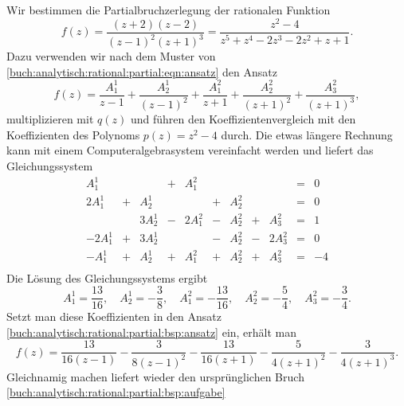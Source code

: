 \begin{beispiel}
Wir bestimmen die Partialbruchzerlegung der rationalen Funktion
\begin{equation}
f(z)
=
\frac{(z+2)(z-2)}{(z-1)^2(z+1)^3}
=
\frac{z^2-4}{z^5+z^4-2z^3-2z^2+z+1}.
\label{buch:analytisch:rational:partial:bsp:aufgabe}
\end{equation}
Dazu verwenden wir nach dem Muster von
\eqref{buch:analytisch:rational:partial:eqn:ansatz}
den Ansatz
\begin{equation}
f(z)
=
\frac{A^1_1}{z-1}
+
\frac{A^1_2}{(z-1)^2}
+
\frac{A^2_1}{z+1}
+
\frac{A^2_2}{(z+1)^2}
+
\frac{A^2_3}{(z+1)^3},
\label{buch:analytisch:rational:partial:bsp:ansatz}
\end{equation}
multiplizieren mit $q(z)$ und führen den Koeffizientenvergleich
mit den Koeffizienten des Polynoms $p(z)=z^2-4$ durch.
Die etwas längere Rechnung kann mit einem Computeralgebrasystem
vereinfacht werden und liefert das Gleichungssystem
\[
\renewcommand{\arraycolsep}{2pt}
\renewcommand{\arraystretch}{1.3}
\begin{array}{rcrcrcrcrcr}
  A^1_1 & &        &+&  A^2_1 & &       & &        &=&  0\\
 2A^1_1 &+&  A^1_2 & &        &+& A^2_2 & &        &=&  0\\
        & & 3A^1_2 &-& 2A^2_1 &-& A^2_2 &+&  A^2_3 &=&  1\\
-2A^1_1 &+& 3A^1_2 & &        &-& A^2_2 &-& 2A^2_3 &=&  0\\
- A^1_1 &+&  A^1_2 &+&  A^2_1 &+& A^2_2 &+&  A^2_3 &=& -4\\
\end{array}
\]
Die Lösung des Gleichungssystems ergibt
\[
A^1_1 =  \frac{13}{16},\quad
A^1_2 = -\frac{ 3}{ 8},\quad
A^2_1 = -\frac{13}{16},\quad
A^2_2 = -\frac{ 5}{ 4},\quad
A^2_3 = -\frac{ 3}{ 4}.
\]
Setzt man diese Koeffizienten in den Ansatz
\eqref{buch:analytisch:rational:partial:bsp:ansatz}
ein, erhält man
\[
f(z)
=
\frac{13}{16(z-1)  }
-
\frac{ 3}{ 8(z-1)^2}
-
\frac{13}{16(z+1)  }
-
\frac{ 5}{ 4(z+1)^2}
-
\frac{ 3}{ 4(z+1)^3}.
\]
Gleichnamig machen liefert wieder den ursprünglichen Bruch
\eqref{buch:analytisch:rational:partial:bsp:aufgabe}
\end{beispiel}

